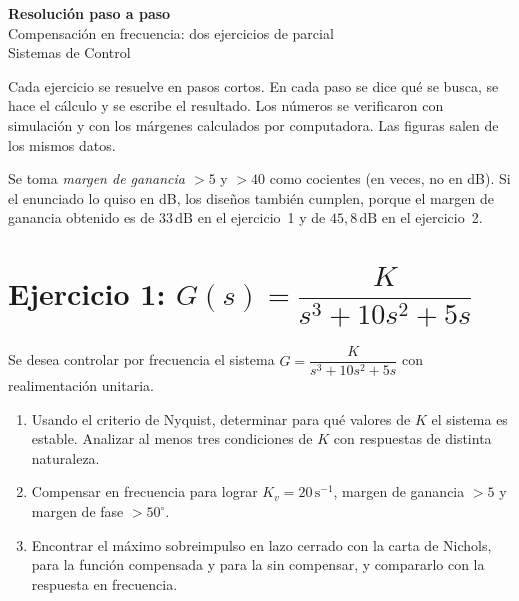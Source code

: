 \documentclass[11pt,a4paper]{article}
\newcommand{\dB}{\,\mathrm{dB}}
\newcounter{paso}[subsection]
\begin{document}
\begin{center}
{\color{azul}\Huge\bfseries Resolución paso a paso}\\[4pt]
{\Large Compensación en frecuencia: dos ejercicios de parcial}\\[4pt]
{\normalsize Sistemas de Control}
\end{center}

\begin{idea}
Cada ejercicio se resuelve en pasos cortos. En cada paso se dice qué se busca, se hace el cálculo y se escribe el resultado.
Los números se verificaron con simulación y con los márgenes calculados por computadora. Las figuras salen de los mismos datos.
\end{idea}

\begin{nota}
Se toma \emph{margen de ganancia $>5$} y \emph{$>40$} como cocientes (en veces, no en dB). Si el enunciado lo quiso en dB,
los diseños también cumplen, porque el margen de ganancia obtenido es de $33\dB$ en el ejercicio~1 y de $45{,}8\dB$ en el ejercicio~2.
\end{nota}

\section{Ejercicio 1: $G(s)=\dfrac{K}{s^3+10s^2+5s}$}
\begin{enunciado}
Se desea controlar por frecuencia el sistema $G=\dfrac{K}{s^3+10s^2+5s}$ con realimentación unitaria.
\begin{enumerate}[label=\alph*)]
\item Usando el criterio de Nyquist, determinar para qué valores de $K$ el sistema es estable. Analizar al menos tres condiciones de $K$ con respuestas de distinta naturaleza.
\item Compensar en frecuencia para lograr $K_v=20\,\mathrm{s^{-1}}$, margen de ganancia $>5$ y margen de fase $>50^\circ$.
\item Encontrar el máximo sobreimpulso en lazo cerrado con la carta de Nichols, para la función compensada y para la sin compensar, y compararlo con la respuesta en frecuencia.
\end{enumerate}
\end{enunciado}
\end{document}

